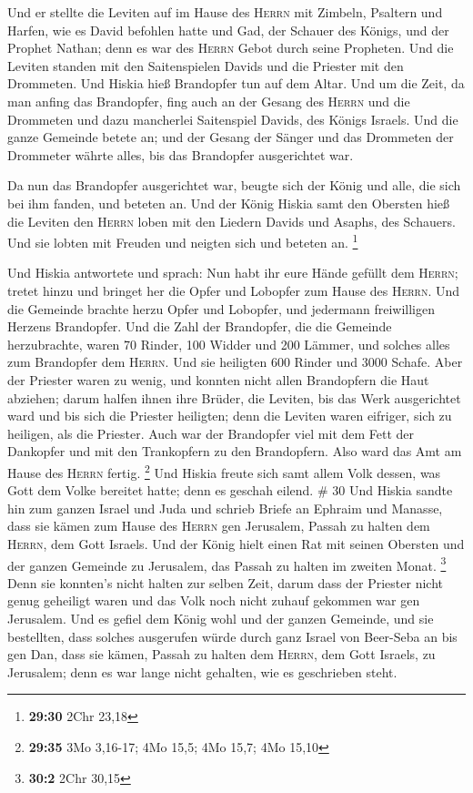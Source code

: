  Und er stellte die Leviten auf im Hause des
\textsc{Herrn} mit Zimbeln, Psaltern und Harfen, wie es David befohlen
hatte und Gad, der Schauer des Königs, und der Prophet Nathan; denn es
war des \textsc{Herrn} Gebot durch seine Propheten.  Und
die Leviten standen mit den Saitenspielen Davids und die Priester mit
den Drommeten.  Und Hiskia hieß Brandopfer tun auf dem
Altar. Und um die Zeit, da man anfing das Brandopfer, fing auch an der
Gesang des \textsc{Herrn} und die Drommeten und dazu mancherlei
Saitenspiel Davids, des Königs Israels.  Und die ganze
Gemeinde betete an; und der Gesang der Sänger und das Drommeten der
Drommeter währte alles, bis das Brandopfer ausgerichtet war.

 Da nun das Brandopfer ausgerichtet war, beugte sich der
König und alle, die sich bei ihm fanden, und beteten an. 
Und der König Hiskia samt den Obersten hieß die Leviten den
\textsc{Herrn} loben mit den Liedern Davids und Asaphs, des Schauers.
Und sie lobten mit Freuden und neigten sich und beteten an. \footnote{\textbf{29:30}
  2Chr 23,18}

 Und Hiskia antwortete und sprach: Nun habt ihr eure
Hände gefüllt dem \textsc{Herrn}; tretet hinzu und bringet her die Opfer
und Lobopfer zum Hause des \textsc{Herrn}. Und die Gemeinde brachte
herzu Opfer und Lobopfer, und jedermann freiwilligen Herzens Brandopfer.
 Und die Zahl der Brandopfer, die die Gemeinde
herzubrachte, waren 70 Rinder, 100 Widder und 200 Lämmer, und solches
alles zum Brandopfer dem \textsc{Herrn}.  Und sie
heiligten 600 Rinder und 3000 Schafe.  Aber der Priester
waren zu wenig, und konnten nicht allen Brandopfern die Haut abziehen;
darum halfen ihnen ihre Brüder, die Leviten, bis das Werk ausgerichtet
ward und bis sich die Priester heiligten; denn die Leviten waren
eifriger, sich zu heiligen, als die Priester.  Auch war
der Brandopfer viel mit dem Fett der Dankopfer und mit den Trankopfern
zu den Brandopfern. Also ward das Amt am Hause des \textsc{Herrn}
fertig. \footnote{\textbf{29:35} 3Mo 3,16-17; 4Mo 15,5; 4Mo 15,7; 4Mo
  15,10}  Und Hiskia freute sich samt allem Volk dessen,
was Gott dem Volke bereitet hatte; denn es geschah eilend. \# 30
 Und Hiskia sandte hin zum ganzen Israel und Juda und
schrieb Briefe an Ephraim und Manasse, dass sie kämen zum Hause des
\textsc{Herrn} gen Jerusalem, Passah zu halten dem \textsc{Herrn}, dem
Gott Israels.  Und der König hielt einen Rat mit seinen
Obersten und der ganzen Gemeinde zu Jerusalem, das Passah zu halten im
zweiten Monat. \footnote{\textbf{30:2} 2Chr 30,15}  Denn
sie konnten's nicht halten zur selben Zeit, darum dass der Priester
nicht genug geheiligt waren und das Volk noch nicht zuhauf gekommen war
gen Jerusalem.  Und es gefiel dem König wohl und der
ganzen Gemeinde,  und sie bestellten, dass solches
ausgerufen würde durch ganz Israel von Beer-Seba an bis gen Dan, dass
sie kämen, Passah zu halten dem \textsc{Herrn}, dem Gott Israels, zu
Jerusalem; denn es war lange nicht gehalten, wie es geschrieben steht.

